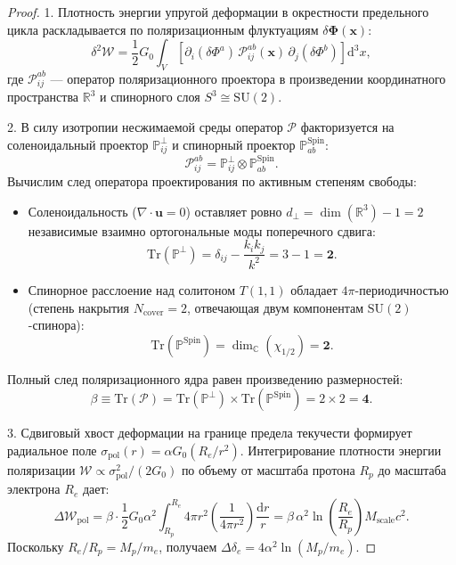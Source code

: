 \documentclass[11pt,a4paper]{article}
\theoremstyle{definition}
\theoremstyle{remark}
\begin{document}
\begin{proof}
1. Плотность энергии упругой деформации в окрестности предельного цикла раскладывается по поляризационным флуктуациям $\delta \boldsymbol{\Phi}(\mathbf{x})$:
\begin{equation}
    \delta^2 \mathcal{W} = \frac{1}{2} G_0 \int_V \left[ \partial_i (\delta \Phi^a) \, \mathcal{P}_{ij}^{ab}(\mathbf{x}) \, \partial_j (\delta \Phi^b) \right] \mathrm{d}^3 x,
\end{equation}
где $\mathcal{P}_{ij}^{ab}$ --- оператор поляризационного проектора в произведении координатного пространства $\mathbb{R}^3$ и спинорного слоя $S^3 \cong \mathrm{SU}(2)$.

2. В силу изотропии несжимаемой среды оператор $\mathcal{P}$ факторизуется на соленоидальный проектор $\mathbb{P}^\perp_{ij}$ и спинорный проектор $\mathbb{P}^{\mathrm{Spin}}_{ab}$:
\begin{equation}
    \mathcal{P}_{ij}^{ab} = \mathbb{P}^\perp_{ij} \otimes \mathbb{P}^{\mathrm{Spin}}_{ab}.
\end{equation}
Вычислим след оператора проектирования по активным степеням свободы:
\begin{itemize}
    \item Соленоидальность ($\nabla \cdot \mathbf{u} = 0$) оставляет ровно $d_\perp = \dim(\mathbb{R}^3) - 1 = 2$ независимые взаимно ортогональные моды поперечного сдвига:
    \begin{equation}
        \mathrm{Tr}(\mathbb{P}^\perp) = \delta_{ij} - \frac{k_i k_j}{k^2} = 3 - 1 = \mathbf{2}.
    \end{equation}
    \item Спинорное расслоение над солитоном $T(1,1)$ обладает $4\pi$-периодичностью (степень накрытия $N_{\mathrm{cover}} = 2$, отвечающая двум компонентам $\mathrm{SU}(2)$-спинора):
    \begin{equation}
        \mathrm{Tr}(\mathbb{P}^{\mathrm{Spin}}) = \dim_{\mathbb{C}}(\chi_{1/2}) = \mathbf{2}.
    \end{equation}
\end{itemize}
Полный след поляризационного ядра равен произведению размерностей:
\begin{equation}
    \beta \equiv \mathrm{Tr}(\mathcal{P}) = \mathrm{Tr}(\mathbb{P}^\perp) \times \mathrm{Tr}(\mathbb{P}^{\mathrm{Spin}}) = 2 \times 2 = \mathbf{4}.
\end{equation}

3. Сдвиговый хвост деформации на границе предела текучести формирует радиальное поле $\sigma_{\mathrm{pol}}(r) = \alpha G_0 (R_e / r^2)$. Интегрирование плотности энергии поляризации $\mathcal{W} \propto \sigma_{\mathrm{pol}}^2 / (2G_0)$ по объему от масштаба протона $R_p$ до масштаба электрона $R_e$ дает:
\begin{equation}
    \Delta \mathcal{W}_{\mathrm{pol}} = \beta \cdot \frac{1}{2} G_0 \alpha^2 \int_{R_p}^{R_e} 4\pi r^2 \left( \frac{1}{4\pi r^2} \right) \frac{\mathrm{d}r}{r} = \beta \, \alpha^2 \ln\left(\frac{R_e}{R_p}\right) M_{\mathrm{scale}} c^2.
\end{equation}
Поскольку $R_e / R_p = M_p / m_e$, получаем $\Delta \delta_e = 4 \alpha^2 \ln(M_p / m_e)$.
\end{proof}
\end{document}
